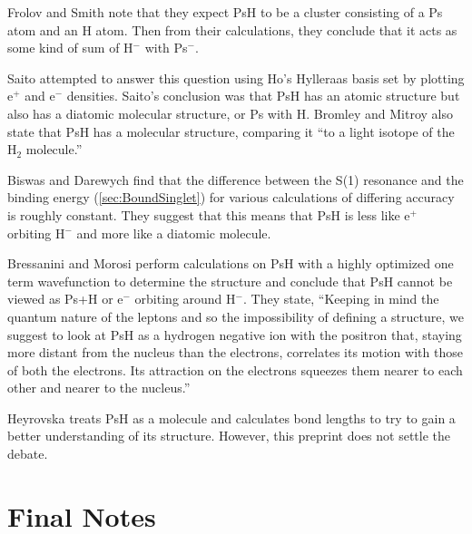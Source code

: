 \documentclass[Dissertation.tex]{subfiles}
\begin{document}
Frolov and Smith \cite{Frolov1997c} note that they expect PsH to be a cluster 
consisting of a Ps atom and an H atom. Then from their calculations, they 
conclude that it acts as some kind of sum of H$^-$ with Ps$^-$.

Saito \cite{Saito2000} attempted to answer this question using Ho's
\cite{Ho1986} Hylleraas basis set by plotting e$^+$ and e$^-$ densities. Saito's 
conclusion was that PsH has an atomic structure but also has a diatomic 
molecular structure, or Ps with H. Bromley and Mitroy \cite{Bromley2001} also 
state that PsH has a molecular structure, comparing it ``to a light isotope 
of the H$_2$ molecule.''

Biswas and Darewych \cite{Biswas2002} find that the difference between the
S(1) resonance and the binding energy (\cref{sec:BoundSinglet}) for various 
calculations of differing accuracy is roughly constant. They suggest that 
this means that PsH is less like e$^+$ orbiting H$^-$ and more like a 
diatomic molecule.

Bressanini and Morosi \cite{Bressanini2003} perform calculations on PsH with 
a highly optimized one term wavefunction to determine the structure and 
conclude that PsH cannot be viewed as Ps+H or e$^-$ orbiting around H$^-$. 
They state, ``Keeping in mind the quantum nature of the leptons and so the 
impossibility of defining a structure, we suggest to look at PsH as a 
hydrogen negative ion with the positron that, staying more distant from the 
nucleus than the electrons, correlates its motion with those of both the 
electrons. Its attraction on the electrons squeezes them nearer to each other 
and nearer to the nucleus.''

Heyrovska \cite{Heyrovska2011} treats PsH as a molecule and calculates bond
lengths to try to gain a better understanding of its structure. However, this
preprint does not settle the debate.


\section{Final Notes}
\label{sec:Units}

\end{document}
